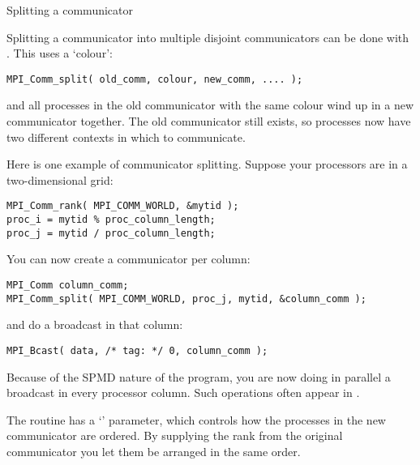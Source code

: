 
 {Splitting a communicator}
\label{sec:comm-split}

Splitting a communicator into multiple disjoint communicators
can be done with .
This uses a `colour':
\begin{verbatim}
MPI_Comm_split( old_comm, colour, new_comm, .... );
\end{verbatim}
  and all processes in the old communicator with the same colour
  wind up in a new communicator together. The old communicator still exists,
  so processes now have two different contexts in which to communicate.

Here is one example of communicator splitting. Suppose your processors
are in a two-dimensional grid:
\begin{verbatim}
MPI_Comm_rank( MPI_COMM_WORLD, &mytid );
proc_i = mytid % proc_column_length;
proc_j = mytid / proc_column_length;
\end{verbatim}
You can now create a communicator per column:
\begin{verbatim}
MPI_Comm column_comm;
MPI_Comm_split( MPI_COMM_WORLD, proc_j, mytid, &column_comm );
\end{verbatim}
and do a broadcast in that column:
\begin{verbatim}
MPI_Bcast( data, /* tag: */ 0, column_comm );
\end{verbatim}
Because of the SPMD nature of the program, you are now doing in parallel
a broadcast in every processor column. Such operations often appear
in .

The  routine has a `' parameter,
which controls how the processes in the new communicator are
ordered. By supplying the rank from the original communicator you let
them be arranged in the same order.

